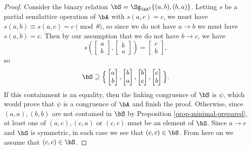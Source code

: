 \begin{proof}
Consider the binary relation $\bS = \Sg_{\bA^2}\{(a,b),(b,a)\}$. Letting $s$ be a partial semilattice operation of $\bA$ with $s(a,c) = c$, we must have $s(a,b) \equiv s(a,c) = c \pmod{\theta}$, so since we do not have $a \rightarrow b$ we must have $s(a,b) = c$. Then by our assumption that we do not have $b \rightarrow c$, we have
\[
s\left(\begin{bmatrix} a\\ b\end{bmatrix}, \begin{bmatrix} b\\ a\end{bmatrix}\right) = \begin{bmatrix} c\\ b\end{bmatrix},
\]
so
\[
\bS \supseteq \Big\{\begin{bmatrix} a\\ b\end{bmatrix},\begin{bmatrix} b\\ a\end{bmatrix},\begin{bmatrix} b\\ c\end{bmatrix},\begin{bmatrix} c\\ b\end{bmatrix}\Big\}.
\]
If this containment is an equality, then the linking congruence of $\bS$ is $\psi$, which would prove that $\psi$ is a congruence of $\bA$ and finish the proof. Otherwise, since $(a,a), (b,b)$ are not contained in $\bS$ by Proposition \ref{prop-minimal-prepared}, at least one of $(a,c), (c,a)$ or $(c,c)$ must be an element of $\bS$. Since $a \rightarrow c$ and $\bS$ is symmetric, in each case we see that $(c,c) \in \bS$. From here on we assume that $(c,c) \in \bS$.


\end{proof}
